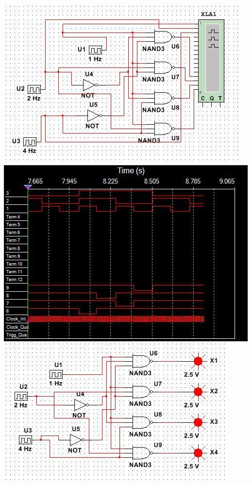 \documentclass[a4paper,12pt]{article}
\begin{document}
\begin{center}
	\includegraphics[scale=1.1]{../screens/1.jpg} \newline\newline 
	\includegraphics[scale=1.1]{../screens/1_2.jpg} \newline\newline 
	\includegraphics[scale=1.1]{../screens/1_3.jpg} \newline
	

\end{center}
\end{document}
